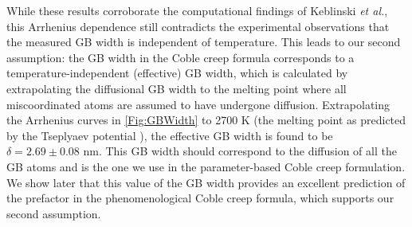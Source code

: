 \documentclass[preprint,12pt,sort&compress]{elsarticle}
\newcommand{\?}{\stackrel{?}{=}}
\begin{document}
While these results corroborate the computational findings of Keblinski \textit{et al.}, this Arrhenius dependence still contradicts the experimental observations that the measured GB width is independent of temperature. This leads to our second assumption: the GB width in the Coble creep formula corresponds to a temperature-independent (effective) GB width, which is calculated by extrapolating the diffusional GB width to the melting point where all miscoordinated atoms are assumed to have undergone diffusion. Extrapolating the Arrhenius curves in \cref{Fig:GBWidth} to 2700 K (the melting point as predicted by the Tseplyaev potential \cite{AbdulHameed2024}), the effective GB width is found to be $\delta = 2.69 \pm 0.08$ nm. This GB width should correspond to the diffusion of all the GB atoms and is the one we use in the parameter-based Coble creep formulation. We show later that this value of the GB width provides an excellent prediction of the prefactor in the phenomenological Coble creep formula, which supports our second assumption.
\end{document}

